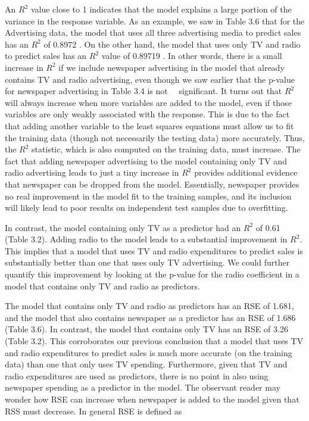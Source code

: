 \documentclass[10pt]{article}
\begin{document}
An $R^{2}$ value close to 1 indicates that the model explains a large portion of the variance in the response variable. As an example, we saw in Table 3.6 that for the Advertising data, the model that uses all three advertising media to predict sales has an $R^{2}$ of 0.8972 . On the other hand, the model that uses only TV and radio to predict sales has an $R^{2}$ value of 0.89719 . In other words, there is a small increase in $R^{2}$ if we include newspaper advertising in the model that already contains TV and radio advertising, even though we saw earlier that the p-value for newspaper advertising in Table 3.4 is not\
\
significant. It turns out that $R^{2}$ will always increase when more variables are added to the model, even if those variables are only weakly associated with the response. This is due to the fact that adding another variable to the least squares equations must allow us to fit the training data (though not necessarily the testing data) more accurately. Thus, the $R^{2}$ statistic, which is also computed on the training data, must increase. The fact that adding newspaper advertising to the model containing only TV and radio advertising leads to just a tiny increase in $R^{2}$ provides additional evidence that newspaper can be dropped from the model. Essentially, newspaper provides no real improvement in the model fit to the training samples, and its inclusion will likely lead to poor results on independent test samples due to overfitting.

In contrast, the model containing only TV as a predictor had an $R^{2}$ of 0.61 (Table 3.2). Adding radio to the model leads to a substantial improvement in $R^{2}$. This implies that a model that uses TV and radio expenditures to predict sales is substantially better than one that uses only TV advertising. We could further quantify this improvement by looking at the p-value for the radio coefficient in a model that contains only TV and radio as predictors.

The model that contains only TV and radio as predictors has an RSE of 1.681, and the model that also contains newspaper as a predictor has an RSE of 1.686 (Table 3.6). In contrast, the model that contains only TV has an RSE of 3.26 (Table 3.2). This corroborates our previous conclusion that a model that uses TV and radio expenditures to predict sales is much more accurate (on the training data) than one that only uses TV spending. Furthermore, given that TV and radio expenditures are used as predictors, there is no point in also using newspaper spending as a predictor in the model. The observant reader may wonder how RSE can increase when newspaper is added to the model given that RSS must decrease. In general RSE is defined as
\end{document}
